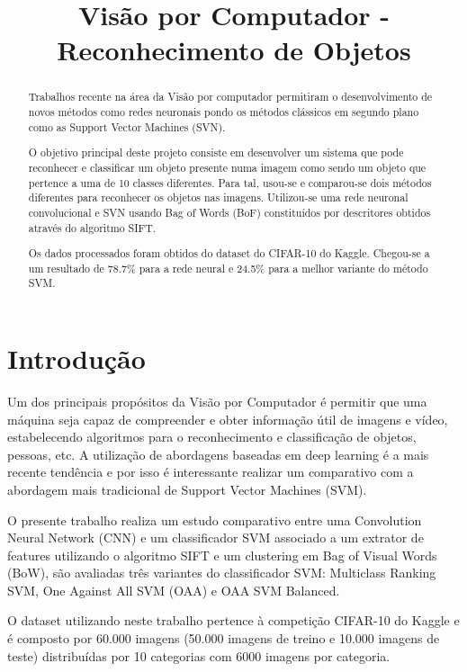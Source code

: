 \documentclass[extendedabs]{vcom}
\title{Visão por Computador - Reconhecimento de Objetos}
\begin{document}
\maketitle

\begin{abstract}
Trabalhos recente na área da Visão por computador permitiram o desenvolvimento de novos métodos como redes neuronais pondo os métodos clássicos em segundo plano como as Support Vector Machines (SVN). 

O objetivo principal deste projeto consiste em desenvolver um sistema que pode reconhecer e classificar um objeto presente numa imagem como sendo um objeto que pertence a uma de 10 classes diferentes. Para tal, usou-se e comparou-se dois métodos diferentes para reconhecer os objetos nas imagens. Utilizou-se uma rede neuronal convolucional e SVN usando Bag of Words (BoF) constituídos por descritores obtidos através do algoritmo SIFT. 

Os dados processados foram obtidos do dataset do CIFAR-10 do Kaggle. Chegou-se a um resultado de 78.7\% para a rede neural e 24.5\% para a melhor variante do método SVM.
\end{abstract}

\section{Introdução}
\label{sec:intro}
Um dos principais propósitos da Visão por Computador é permitir que uma máquina seja capaz de compreender e obter informação útil de imagens e vídeo, estabelecendo algoritmos para o reconhecimento e classificação de objetos, pessoas, etc. A utilização de abordagens baseadas em deep learning é a mais recente tendência e por isso é interessante realizar um comparativo com a abordagem mais tradicional de Support Vector Machines (SVM). 

O presente trabalho realiza um estudo comparativo entre uma Convolution Neural Network (CNN) e um classificador SVM associado a um extrator de features utilizando o algoritmo SIFT e um clustering em Bag of Visual Words (BoW), são avaliadas três variantes do classificador SVM: Multiclass Ranking SVM, One Against All SVM (OAA) e OAA SVM Balanced. 

O dataset utilizando neste trabalho pertence à competição CIFAR-10 do Kaggle e é composto por 60.000 imagens (50.000 imagens de treino e 10.000 imagens de teste) distribuídas por 10 categorias com 6000 imagens por categoria.
\end{document}
